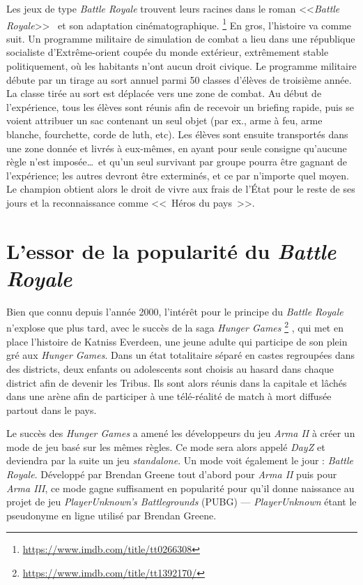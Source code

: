 Les jeux de type \emph{Battle Royale} trouvent leurs racines dans le roman <<\emph{Battle Royale}>>~\cite{takami2003battle} et son adaptation cinématographique.%
%
\footnote{\url{https://www.imdb.com/title/tt0266308}}
%
En gros, l'histoire va comme suit.
Un programme militaire de simulation de combat a lieu dans une république socialiste d'Extrême-orient coupée du monde extérieur, extrêmement stable politiquement, o\`u les habitants n'ont aucun droit civique. Le programme militaire d\'ebute par un tirage au sort annuel parmi 50 classes d'élèves de troisième année. La classe tirée au sort est déplacée vers une zone de combat. Au début de l'expérience, tous les élèves sont réunis afin de recevoir un briefing rapide, puis se voient attribuer un sac contenant un seul objet (par ex., arme à feu, arme blanche, fourchette, corde de luth, etc). Les \'el\`eves sont ensuite transport\'es dans une zone donnée et livrés à eux-mêmes, en ayant pour seule consigne qu'aucune règle n'est imposée\ldots\ et qu'un seul survivant par groupe pourra être gagnant de l'expérience;  les autres devront être exterminés, et ce par n'importe quel moyen. Le champion obtient alors le droit de vivre aux frais de l'État pour le reste de ses jours et la reconnaissance comme <<~Héros du pays~>>.

\section{L'essor de la popularité du \emph{Battle Royale}}
Bien que connu depuis l'ann\'ee 2000, l'intérêt pour le principe du \emph{Battle Royale} n'explose que plus tard, avec le succès de la saga \emph{Hunger Games}%
%
\footnote{\url{https://www.imdb.com/title/tt1392170/}}
%
, qui met en place l'histoire de Katniss Everdeen, une jeune adulte qui participe de son plein gré aux \emph{Hunger Games}. Dans un état totalitaire séparé en castes regroupées dans des districts, deux enfants ou adolescents sont choisis au hasard dans chaque district afin de devenir les Tribus. Ils sont alors réunis dans la capitale et lâchés dans une arène afin de participer à une télé-réalité de match à mort diffusée partout dans le pays.

Le succès des \emph{Hunger Games} a amené les développeurs du jeu \emph{Arma II} à créer un mode de jeu basé sur les mêmes règles. Ce mode sera alors appelé \emph{DayZ} et deviendra par la suite un jeu \emph{standalone}. Un mode voit également le jour : \emph{Battle Royale}. Développé par Brendan Greene tout d'abord pour \emph{Arma II} puis pour \emph{Arma III}, ce mode gagne suffisament en popularité pour qu'il donne naissance au projet de jeu \emph{PlayerUnknown's Battlegrounds} (PUBG) --- \emph{PlayerUnknown} étant le pseudonyme en ligne utilisé par Brendan Greene.

